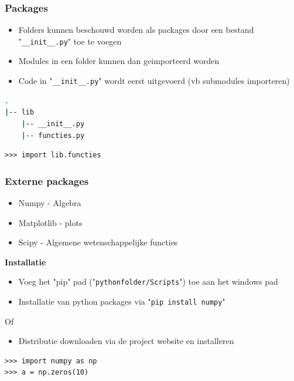 \documentclass[t]{beamer}
\begin{document}
\begin{frame}[fragile]
	\frametitle{Packages}
	\begin{itemize}
		\item Folders kunnen beschouwd worden als packages door een bestand "\lstinline{__init__.py}" toe te voegen
		\item Modules in een folder kunnen dan geimporteerd worden
		\item Code in "\lstinline{__init__.py}" wordt eerst uitgevoerd (vb submodules importeren)
	\end{itemize}
	
	\vspace{0.5cm}	
	\begin{lstlisting}[language=bash]
.	
|-- lib
    |-- __init__.py
    |-- functies.py
	\end{lstlisting}
	
	\vspace{0.5cm}
	\begin{lstlisting}
>>> import lib.functies
	\end{lstlisting}	
	
\end{frame}
\begin{frame}[fragile]
	\frametitle{Externe packages}
	
	\begin{itemize}
		\item Numpy - Algebra
        \item Matplotlib - plots
        \item Scipy - Algemene wetenschappelijke functies
	\end{itemize}
	
    \textbf{Installatie}
    \begin{itemize}
    	\item Voeg het "pip" pad ("\lstinline[language=bash]{pythonfolder/Scripts}") toe aan het windows pad
		\item Installatie van python packages via "\lstinline[language=bash]{pip install numpy}"
	\end{itemize}
	Of
	\begin{itemize}
        \item Distributie downloaden via de project website en installeren
	\end{itemize}
	
	\vspace{0.5cm}
	\begin{lstlisting}
>>> import numpy as np
>>> a = np.zeros(10)
	\end{lstlisting}
\end{frame}
\end{document}
